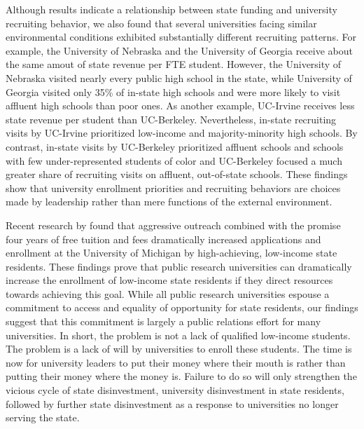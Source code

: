 \documentclass[twoside]{article}
\begin{document}
Although results indicate a relationship between state funding and university recruiting behavior, we also found that several universities facing similar environmental conditions exhibited substantially different recruiting patterns. For example, the University of Nebraska and the University of Georgia receive about the same amout of state revenue per FTE student. However, the University of Nebraska visited nearly every public high school in the state, while University of Georgia visited only 35\% of in-state high schools and were more likely to visit affluent high schools than poor ones. As another example, UC-Irvine receives less state revenue per student than UC-Berkeley. Nevertheless, in-state recruiting visits by UC-Irvine prioritized low-income and majority-minority high schools. By contrast, in-state visits by UC-Berkeley prioritized affluent schools and schools with few under-represented students of color and UC-Berkeley focused a much greater share of recruiting visits on affluent, out-of-state schools.  These findings show that university enrollment priorities and recruiting behaviors are choices made by leadership rather than mere functions of the external environment. 

Recent research by \cite{RN4408} found that aggressive outreach combined with the promise four years of free tuition and fees dramatically increased applications and enrollment at the University of Michigan by high-achieving, low-income state residents.  These findings prove that public research universities can dramatically increase the enrollment of low-income state residents if they direct resources towards achieving this goal.  While all public research universities espouse a commitment to access and equality of opportunity for state residents, our findings suggest that this commitment is largely a public relations effort for many universities. In short, the problem is not a lack of qualified low-income students. The problem is a lack of will by universities to enroll these students.  The time is now for university leaders to put their money where their mouth is rather than putting their money where the money is.  Failure to do so will only strengthen the vicious cycle of state disinvestment, university disinvestment in state residents, followed by further state disinvestment as a response to universities no longer serving the state.
\end{document}
